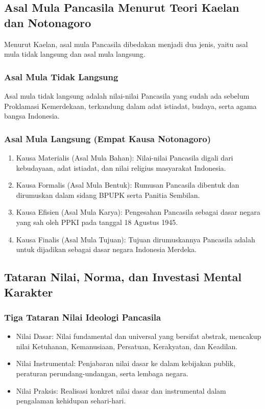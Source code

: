 \subsection{Asal Mula Pancasila Menurut Teori Kaelan dan Notonagoro}

Menurut Kaelan, asal mula Pancasila dibedakan menjadi dua jenis, yaitu asal mula tidak langsung dan asal mula langsung.

\subsubsection{Asal Mula Tidak Langsung}
Asal mula tidak langsung adalah nilai-nilai Pancasila yang sudah ada sebelum Proklamasi Kemerdekaan, terkandung dalam adat istiadat, budaya, serta agama bangsa Indonesia.

\subsubsection{Asal Mula Langsung (Empat Kausa Notonagoro)}
\begin{enumerate}
\item Kausa Materialis (Asal Mula Bahan): Nilai-nilai Pancasila digali dari kebudayaan, adat istiadat, dan nilai religius masyarakat Indonesia.
\item Kausa Formalis (Asal Mula Bentuk): Rumusan Pancasila dibentuk dan dirumuskan dalam sidang BPUPK serta Panitia Sembilan.
\item Kausa Efisien (Asal Mula Karya): Pengesahan Pancasila sebagai dasar negara yang sah oleh PPKI pada tanggal 18 Agustus 1945.
\item Kausa Finalis (Asal Mula Tujuan): Tujuan dirumuskannya Pancasila adalah untuk dijadikan sebagai dasar negara Indonesia Merdeka.
\end{enumerate}

\subsection{Tataran Nilai, Norma, dan Investasi Mental Karakter}

\subsubsection{Tiga Tataran Nilai Ideologi Pancasila}
\begin{itemize}
\item Nilai Dasar: Nilai fundamental dan universal yang bersifat abstrak, mencakup nilai Ketuhanan, Kemanusiaan, Persatuan, Kerakyatan, dan Keadilan.
\item Nilai Instrumental: Penjabaran nilai dasar ke dalam kebijakan publik, peraturan perundang-undangan, serta lembaga negara.
\item Nilai Praksis: Realisasi konkret nilai dasar dan instrumental dalam pengalaman kehidupan sehari-hari.
\end{itemize}

